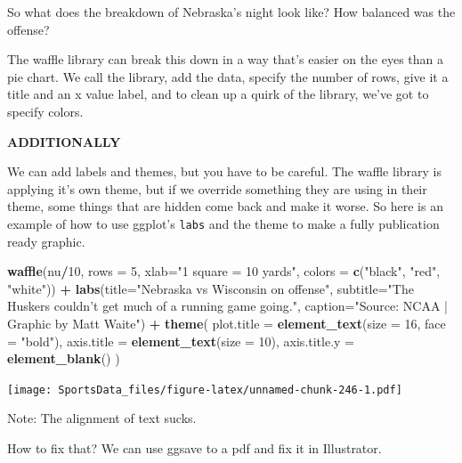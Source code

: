 \documentclass[]{book}
\newenvironment{Shaded}{\begin{snugshade}}{\end{snugshade}}
\newcommand{\KeywordTok}[1]{\textcolor[rgb]{0.13,0.29,0.53}{\textbf{#1}}}
\newcommand{\DataTypeTok}[1]{\textcolor[rgb]{0.13,0.29,0.53}{#1}}
\newcommand{\DecValTok}[1]{\textcolor[rgb]{0.00,0.00,0.81}{#1}}
\newcommand{\StringTok}[1]{\textcolor[rgb]{0.31,0.60,0.02}{#1}}
\newcommand{\OperatorTok}[1]{\textcolor[rgb]{0.81,0.36,0.00}{\textbf{#1}}}
\newcommand{\NormalTok}[1]{#1}
\begin{document}
So what does the breakdown of Nebraska's night look like? How balanced
was the offense?

The waffle library can break this down in a way that's easier on the
eyes than a pie chart. We call the library, add the data, specify the
number of rows, give it a title and an x value label, and to clean up a
quirk of the library, we've got to specify colors.

\textbf{ADDITIONALLY}

We can add labels and themes, but you have to be careful. The waffle
library is applying it's own theme, but if we override something they
are using in their theme, some things that are hidden come back and make
it worse. So here is an example of how to use ggplot's \texttt{labs} and
the theme to make a fully publication ready graphic.

\begin{Shaded}
\begin{Highlighting}[]
\KeywordTok{waffle}\NormalTok{(nu}\OperatorTok{/}\DecValTok{10}\NormalTok{, }\DataTypeTok{rows =} \DecValTok{5}\NormalTok{, }\DataTypeTok{xlab=}\StringTok{"1 square = 10 yards"}\NormalTok{, }\DataTypeTok{colors =} \KeywordTok{c}\NormalTok{(}\StringTok{"black"}\NormalTok{, }\StringTok{"red"}\NormalTok{, }\StringTok{"white"}\NormalTok{)) }\OperatorTok{+}\StringTok{ }\KeywordTok{labs}\NormalTok{(}\DataTypeTok{title=}\StringTok{"Nebraska vs Wisconsin on offense"}\NormalTok{, }\DataTypeTok{subtitle=}\StringTok{"The Huskers couldn't get much of a running game going."}\NormalTok{, }\DataTypeTok{caption=}\StringTok{"Source: NCAA | Graphic by Matt Waite"}\NormalTok{) }\OperatorTok{+}\StringTok{ }
\StringTok{  }\KeywordTok{theme}\NormalTok{(}
    \DataTypeTok{plot.title =} \KeywordTok{element_text}\NormalTok{(}\DataTypeTok{size =} \DecValTok{16}\NormalTok{, }\DataTypeTok{face =} \StringTok{"bold"}\NormalTok{),}
    \DataTypeTok{axis.title =} \KeywordTok{element_text}\NormalTok{(}\DataTypeTok{size =} \DecValTok{10}\NormalTok{),}
    \DataTypeTok{axis.title.y =} \KeywordTok{element_blank}\NormalTok{()}
\NormalTok{  )}
\end{Highlighting}
\end{Shaded}

\texttt{[image: SportsData\_files/figure-latex/unnamed-chunk-246-1.pdf]}

Note: The alignment of text sucks.

How to fix that? We can use ggsave to a pdf and fix it in Illustrator.
\end{document}
